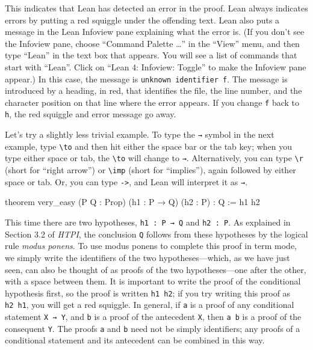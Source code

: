 \documentclass[
  letterpaper,
  DIV=11,
  numbers=noendperiod]{scrreprt}
\newenvironment{Shaded}{\begin{snugshade}}{\end{snugshade}}
\newcommand{\KeywordTok}[1]{\textcolor[rgb]{0.00,0.23,0.31}{#1}}
\newcommand{\NormalTok}[1]{\textcolor[rgb]{0.00,0.23,0.31}{#1}}
\renewcommand{\NormalTok}[1]{\textcolor[HTML]{000000}{#1}}
\renewcommand{\KeywordTok}[1]{\textcolor[HTML]{0000FF}{#1}}
\newcommand{\excl}[1]{}
\theoremstyle{remark}
\begin{document}
This indicates that Lean has detected an error in the proof. Lean always
indicates errors by putting a red squiggle under the offending text.
Lean also puts a message in the Lean Infoview pane explaining what the
error is. (If you don't see the Infoview pane, choose ``Command Palette
\ldots{}'' in the ``View'' menu, and then type ``Lean'' in the text box
that appears. You will see a list of commands that start with ``Lean''.
Click on ``Lean 4: Infoview: Toggle'' to make the Infoview pane appear.)
In this case, the message is
\texttt{unknown\ identifier\ \textquotesingle{}f\textquotesingle{}}. The
message is introduced by a heading, in red, that identifies the file,
the line number, and the character position on that line where the error
appears. If you change \texttt{f} back to \texttt{h}, the red squiggle
and error message go away.

Let's try a slightly less trivial example. To type the \texttt{→} symbol
in the next example, type \texttt{\textbackslash{}to} and then hit
either the space bar or the tab key; when you type either space or tab,
the \texttt{\textbackslash{}to} will change to \texttt{→}.
Alternatively, you can type \texttt{\textbackslash{}r} (short for
``right arrow'') or \texttt{\textbackslash{}imp} (short for
``implies''), again followed by either space or tab. Or, you can type
\excl{\texttt{-\textgreater{}}}\texttt{-\null>}, and Lean will interpret
it as \texttt{→}.

\begin{Shaded}
\begin{Highlighting}[]
\KeywordTok{theorem}\NormalTok{ very\_easy}
\NormalTok{(P Q : }\KeywordTok{Prop}\NormalTok{) (h1 : P → Q) (h2 : P) : Q := h1 h2}
\end{Highlighting}
\end{Shaded}

This time there are two hypotheses, \texttt{h1\ :\ P\ →\ Q} and
\texttt{h2\ :\ P}. As explained in Section 3.2 of \emph{HTPI}, the
conclusion \texttt{Q} follows from these hypotheses by the logical rule
\emph{modus ponens}. To use modus ponens to complete this proof in term
mode, we simply write the identifiers of the two hypotheses---which, as
we have just seen, can also be thought of as proofs of the two
hypotheses---one after the other, with a space between them. It is
important to write the proof of the conditional hypothesis first, so the
proof is written \texttt{h1\ h2}; if you try writing this proof as
\texttt{h2\ h1}, you will get a red squiggle. In general, if \texttt{a}
is a proof of any conditional statement \texttt{X\ →\ Y}, and \texttt{b}
is a proof of the antecedent \texttt{X}, then \texttt{a\ b} is a proof
of the consequent \texttt{Y}. The proofs \texttt{a} and \texttt{b} need
not be simply identifiers; any proofs of a conditional statement and its
antecedent can be combined in this way.
\end{document}
